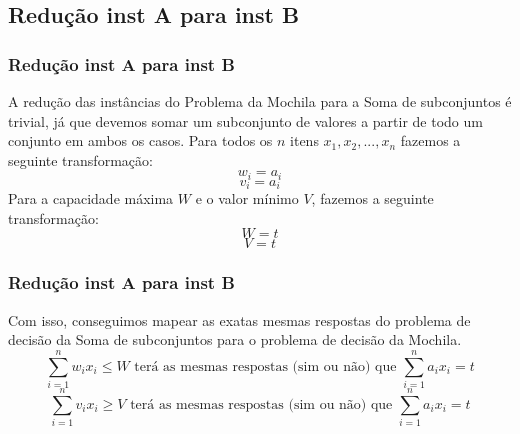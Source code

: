 \documentclass{beamer}
\begin{document}
\subsection{Redução inst A para inst B}
\begin{frame}
    \frametitle{Redução inst A para inst B}
        A redução das instâncias do Problema da Mochila para a Soma de subconjuntos é trivial, já que devemos somar um subconjunto de valores a partir de todo um conjunto em ambos os casos.
        \newline
        \newline
        Para todos os $n$ itens $x_{1}, x_{2}, ..., x_{n}$ fazemos a seguinte transformação:
        \begin{equation*}
            w_{i} = a_{i}
        \end{equation*}
        \begin{equation*}
            v_{i} = a_{i}
        \end{equation*}
        Para a capacidade máxima $W$ e o valor mínimo $V$, fazemos a seguinte transformação:
        \begin{equation*}
            W = t
        \end{equation*}
        \begin{equation*}
            V = t
        \end{equation*}
        
\end{frame}

\begin{frame}
    \frametitle{Redução inst A para inst B}
        Com isso, conseguimos mapear as exatas mesmas respostas do problema de decisão da Soma de subconjuntos para o problema de decisão da Mochila.
         \begin{equation*}
            \sum_{i=1}^{n} w_{i} x_{i} \leq W \mbox{ terá as mesmas respostas (sim ou não) que } \sum_{i=1}^{n} a_{i} x_{i} = t
         \end{equation*}
         \begin{equation*}
            \sum_{i=1}^{n} v_{i} x_{i} \geq V \mbox{ terá as mesmas respostas (sim ou não) que } \sum_{i=1}^{n} a_{i} x_{i} = t
         \end{equation*}
\end{frame}

\end{document}
